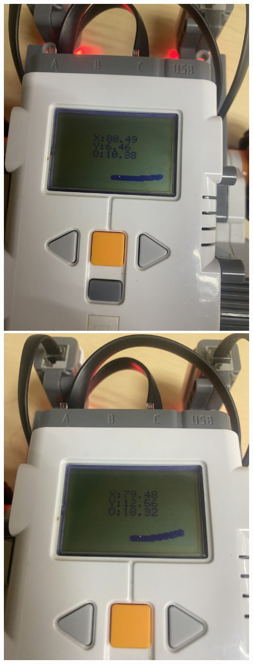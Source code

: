 \documentclass[oneside,onecolumn]{article}
\begin{document}
\includegraphics[scale=0.09]{graficos/error1.png}
\includegraphics[scale=0.09]{graficos/error2.png}
\end{document}

